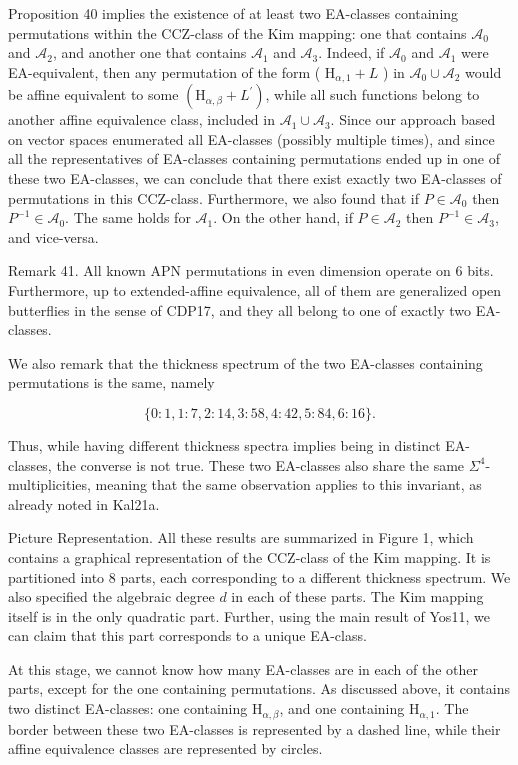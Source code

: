 \documentclass[10pt]{article}
\begin{document}
Proposition 40 implies the existence of at least two EA-classes containing permutations within the CCZ-class of the Kim mapping: one that contains $\mathcal{A}_{0}$ and $\mathcal{A}_{2}$, and another one that contains $\mathcal{A}_{1}$ and $\mathcal{A}_{3}$. Indeed, if $\mathcal{A}_{0}$ and $\mathcal{A}_{1}$ were EA-equivalent, then any permutation of the form ( $\mathrm{H}_{\alpha, 1}+L$ ) in $\mathcal{A}_{0} \cup \mathcal{A}_{2}$ would be affine equivalent to some $\left(\mathrm{H}_{\alpha, \beta}+L^{\prime}\right)$, while all such functions belong to another affine equivalence class, included in $\mathcal{A}_{1} \cup \mathcal{A}_{3}$. Since our approach based on vector spaces enumerated all EA-classes (possibly multiple times), and since all the representatives of EA-classes containing permutations ended up in one of these two EA-classes, we can conclude that there exist exactly two EA-classes of permutations in this CCZ-class. Furthermore, we also found that if $P \in \mathcal{A}_{0}$ then $P^{-1} \in \mathcal{A}_{0}$. The same holds for $\mathcal{A}_{1}$. On the other hand, if $P \in \mathcal{A}_{2}$ then $P^{-1} \in \mathcal{A}_{3}$, and vice-versa.

Remark 41. All known APN permutations in even dimension operate on 6 bits. Furthermore, up to extended-affine equivalence, all of them are generalized open butterflies in the sense of CDP17, and they all belong to one of exactly two EA-classes.

We also remark that the thickness spectrum of the two EA-classes containing permutations is the same, namely

$$
\{0: 1,1: 7,2: 14,3: 58,4: 42,5: 84,6: 16\} .
$$

Thus, while having different thickness spectra implies being in distinct EA-classes, the converse is not true. These two EA-classes also share the same $\Sigma^{4}$-multiplicities, meaning that the same observation applies to this invariant, as already noted in Kal21a.

Picture Representation. All these results are summarized in Figure 1, which contains a graphical representation of the CCZ-class of the Kim mapping. It is partitioned into 8 parts, each corresponding to a different thickness spectrum. We also specified the algebraic degree $d$ in each of these parts. The Kim mapping itself is in the only quadratic part. Further, using the main result of Yos11, we can claim that this part corresponds to a unique EA-class.

At this stage, we cannot know how many EA-classes are in each of the other parts, except for the one containing permutations. As discussed above, it contains two distinct EA-classes: one containing $\mathrm{H}_{\alpha, \beta}$, and one containing $\mathrm{H}_{\alpha, 1}$. The border between these two EA-classes is represented by a dashed line, while their affine equivalence classes are represented by circles.
\end{document}
